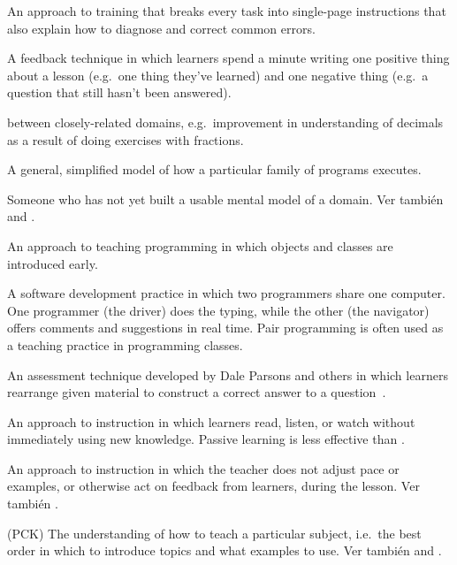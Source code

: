 \begin{description}
 An approach to training that breaks
every task into single-page instructions that also explain how to diagnose and
correct common errors.

 A feedback technique in which learners
spend a minute writing one positive thing about a lesson (e.g.\ one thing
they've learned) and one negative thing (e.g.\ a question that still hasn't been
answered).

 
between closely-related domains, e.g.\ improvement in understanding of decimals
as a result of doing exercises with fractions.

 A general, simplified model of how
a particular family of programs executes.

 Someone who has not yet built a usable mental model of
a domain. Ver también 
and .

 An approach to teaching programming in
which objects and classes are introduced early.

 A software development practice in
which two programmers share one computer. One programmer (the driver) does the
typing, while the other (the navigator) offers comments and suggestions in real
time. Pair programming is often used as a teaching practice in programming
classes.

 An assessment technique developed by
Dale Parsons and others in which learners rearrange given material to construct
a correct answer to a question~\cite{Pars2006}.

 An approach to instruction in which
learners read, listen, or watch without immediately using new knowledge.
Passive learning is less effective than .

 An approach to instruction in which
the teacher does not adjust pace or examples, or otherwise act on feedback from
learners, during the lesson.  Ver también .

 (PCK)
The understanding of how to teach a particular subject, i.e.\ the best order in
which to introduce topics and what examples to use. Ver también
and .


\end{description}
